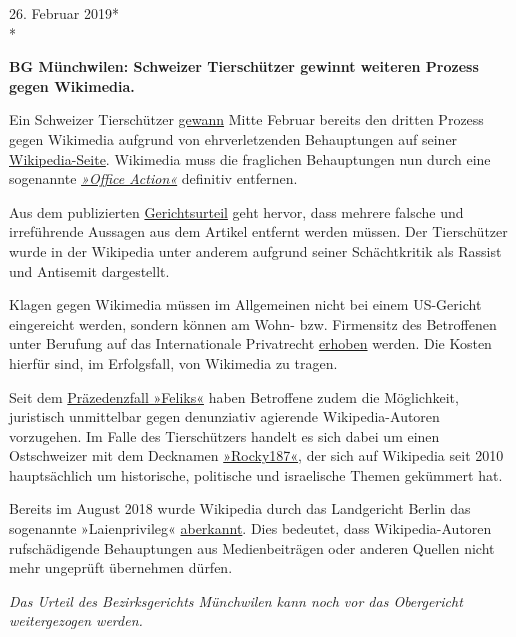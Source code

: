 26. Februar 2019*\\
*

\textbf{BG Münchwilen: Schweizer Tierschützer gewinnt weiteren Prozess
gegen Wikimedia.}

Ein Schweizer Tierschützer
\href{https://www.vgt.ch/news/190224-wikipedia.htm}{gewann} Mitte
Februar bereits den dritten Prozess gegen Wikimedia aufgrund von
ehrverletzenden Behauptungen auf seiner
\href{https://de.wikipedia.org/wiki/Erwin_Kessler}{Wikipedia-Seite}.
Wikimedia muss die fraglichen Behauptungen nun durch eine sogenannte
\href{https://de.wikipedia.org/wiki/Wikipedia:Office_Action}{\emph{»Office
Action«}} definitiv entfernen.

Aus dem publizierten
\href{https://www.vgt.ch/doc/hetzkampagne/190214-wikipedia-urteil.pdf}{Gerichtsurteil}
geht hervor, dass mehrere falsche und irreführende Aussagen aus dem
Artikel entfernt werden müssen. Der Tierschützer wurde in der Wikipedia
unter anderem aufgrund seiner Schächtkritik als Rassist und Antisemit
dargestellt.

Klagen gegen Wikimedia müssen im Allgemeinen nicht bei einem US-Gericht
eingereicht werden, sondern können am Wohn- bzw. Firmensitz des
Betroffenen unter Berufung auf das Internationale Privatrecht
\href{https://www.watson.ch/schweiz/digital/989282505-tierschuetzer-kessler-knoepft-sich-facebook-und-wikipedia-vor-und-gewinnt}{erhoben}
werden. Die Kosten hierfür sind, im Erfolgsfall, von Wikimedia zu
tragen.

Seit dem \href{https://swprs.org/der-wikipedia-prozess/}{Präzedenzfall
»Feliks«} haben Betroffene zudem die Möglichkeit, juristisch unmittelbar
gegen denunziativ agierende Wikipedia-Autoren vorzugehen. Im Falle des
Tierschützers handelt es sich dabei um einen Ostschweizer mit dem
Decknamen
\href{https://de.wikipedia.org/w/index.php?title=Spezial:Beitr\%C3\%A4ge/Rocky187\&offset=\&limit=500\&target=Rocky187}{»Rocky187«},
der sich auf Wikipedia seit 2010 hauptsächlich um historische,
politische und israelische Themen gekümmert hat.

Bereits im August 2018 wurde Wikipedia durch das Landgericht Berlin das
sogenannte »Laienprivileg«
\href{https://www.heise.de/newsticker/meldung/Urteil-gegen-Wikipedia-Keine-rufschaedigende-Kritik-ohne-Recherche-4209610.html}{aberkannt}.
Dies bedeutet, dass Wikipedia-Autoren rufschädigende Behauptungen aus
Medienbeiträgen oder anderen Quellen nicht mehr ungeprüft übernehmen
dürfen.

\emph{Das Urteil des Bezirksgerichts Münchwilen kann noch vor das
Obergericht weitergezogen werden.}

